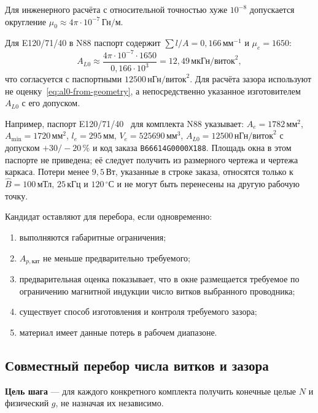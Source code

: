 \documentclass[14pt,a4paper]{extarticle}
\begin{document}
Для инженерного расчёта с относительной точностью хуже $10^{-8}$ допускается
округление $\mu_0\approx4\pi\cdot10^{-7}\,\text{Гн/м}$.

Для E120/71/40 в N88 паспорт содержит
$\sum l/A=0{,}166\,\text{мм}^{-1}$ и $\mu_e=1650$:
\begin{equation}
 A_{L0}\approx
 \frac{4\pi\cdot10^{-7}\cdot1650}
 {0{,}166\cdot10^3}
 =12{,}49\,\text{мкГн/виток}^2,
 \label{eq:al0-e120-check}
\end{equation}
что согласуется с паспортными
$12500\,\text{нГн/виток}^2$. Для расчёта зазора используют
не оценку~\eqref{eq:al0-from-geometry}, а непосредственно указанное
изготовителем $A_{L0}$ с его допуском.

Например, паспорт E120/71/40~\cite{tdkcore} для комплекта N88 указывает:
$A_e=1782\,\text{мм}^2$, $A_{\min}=1720\,\text{мм}^2$,
$l_e=295\,\text{мм}$, $V_e=525690\,\text{мм}^3$,
$A_{L0}=12500\,\text{нГн/виток}^2$ с допуском
$+30/-20\,\%$ и код заказа \texttt{B66614G0000X188}.
Площадь окна в этом паспорте не приведена; её следует получить из
размерного чертежа и чертежа каркаса. Потери менее $9{,}5\,\text{Вт}$,
указанные в строке заказа, относятся только к
$\widehat B=100\,\text{мТл}$, $25\,\text{кГц}$ и
$120\,^{\circ}\text{С}$ и не могут быть перенесены на другую рабочую
точку.

Кандидат оставляют для перебора, если одновременно:
\begin{enumerate}
 \item выполняются габаритные ограничения;
 \item $A_{p,\text{кат}}$ не меньше предварительно требуемого;
 \item предварительная оценка показывает, что в окне размещается требуемое
 по ограничению магнитной индукции число витков выбранного проводника;
 \item существует способ изготовления и контроля требуемого зазора;
 \item материал имеет данные потерь в рабочем диапазоне.
\end{enumerate}

\subsection{Совместный перебор числа витков и зазора}
\label{subsec:turn-gap-loop}

\textbf{Цель шага} --- для каждого конкретного комплекта получить
конечные целые $N$ и физический $g$, не назначая их независимо.
\end{document}

